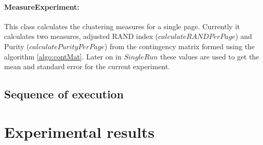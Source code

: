 \paragraph{MeasureExperiment: }
This class calculates the cluatering measures for a single page. Currently it calculates two measures, adjusted RAND index ($calculateRANDPerPage$) and Purity ($calculatePurityPerPage$) from the contingency matrix formed using the algorithm \ref{algo:contMat}. Later on in $SingleRun$ these values are used to get the mean and standard error for the current experiment.

\subsection{Sequence of execution}

\section{Experimental results}
\label{sec:results}
